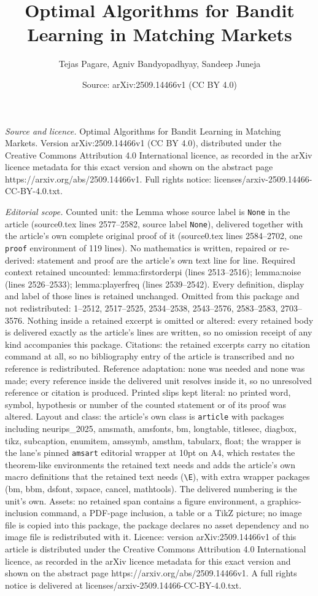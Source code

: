 \documentclass[10pt,a4paper]{amsart}
\title[Optimal Algorithms for Bandit Learning in Matching Markets]{Optimal Algorithms for Bandit Learning in Matching Markets}
\author{Tejas Pagare, Agniv Bandyopadhyay, Sandeep Juneja}
\date{Source: arXiv:2509.14466v1 (CC BY 4.0)}
\begin{document}
\maketitle

\noindent\emph{Source and licence.} Optimal Algorithms for Bandit Learning in Matching Markets. Version arXiv:2509.14466v1 (CC BY 4.0), distributed under the Creative Commons Attribution 4.0 International licence, as recorded in the arXiv licence metadata for this exact version and shown on the abstract page https://arxiv.org/abs/2509.14466v1. Full rights notice: licenses/arxiv-2509.14466-CC-BY-4.0.txt.\par\smallskip

\noindent\textit{Editorial scope.} Counted unit: the Lemma whose source label is \texttt{None} in the article (source0.tex lines 2577--2582, source label \texttt{None}), delivered together with the article's own complete original proof of it (source0.tex lines 2584--2702, one \texttt{proof} environment of 119 lines). No mathematics is written, repaired or re-derived: statement and proof are the article's own text line for line. Required context retained uncounted: lemma:firstorderpi (lines 2513--2516); lemma:noise (lines 2526--2533); lemma:playerfreq (lines 2539--2542). Every definition, display and label of those lines is retained unchanged. Omitted from this package and not redistributed: 1--2512, 2517--2525, 2534--2538, 2543--2576, 2583--2583, 2703--3576. Nothing inside a retained excerpt is omitted or altered: every retained body is delivered exactly as the article's lines are written, so no omission receipt of any kind accompanies this package. Citations: the retained excerpts carry no citation command at all, so no bibliography entry of the article is transcribed and no reference is redistributed. Reference adaptation: none was needed and none was made; every reference inside the delivered unit resolves inside it, so no unresolved reference or citation is produced. Printed slips kept literal: no printed word, symbol, hypothesis or number of the counted statement or of its proof was altered. Layout and class: the article's own class is \texttt{article} with packages including neurips\_2025, amsmath, amsfonts, bm, longtable, titlesec, diagbox, tikz, subcaption, enumitem, amssymb, amsthm, tabularx, float; the wrapper is the lane's pinned \texttt{amsart} editorial wrapper at 10pt on A4, which restates the theorem-like environments the retained text needs and adds the article's own macro definitions that the retained text needs (\texttt{\textbackslash E}), with extra wrapper packages (bm, bbm, dsfont, xspace, cancel, mathtools). The delivered numbering is the unit's own. Assets: no retained span contains a figure environment, a graphics-inclusion command, a PDF-page inclusion, a table or a TikZ picture; no image file is copied into this package, the package declares no asset dependency and no image file is redistributed with it. Licence: version arXiv:2509.14466v1 of this article is distributed under the Creative Commons Attribution 4.0 International licence, as recorded in the arXiv licence metadata for this exact version and shown on the abstract page https://arxiv.org/abs/2509.14466v1. A full rights notice is delivered at licenses/arxiv-2509.14466-CC-BY-4.0.txt. 
\end{document}
